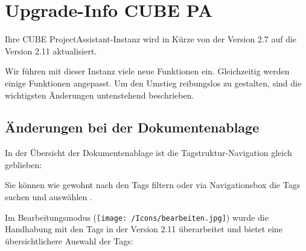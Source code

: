 \section{Upgrade-Info CUBE PA} %

Ihre CUBE ProjectAssistant-Instanz wird in Kürze von der Version 2.7 auf die Version 2.11 aktualisiert.

\vspace{\baselineskip}

Wir führen mit dieser Instanz viele neue Funktionen ein. Gleichzeitig werden einige Funktionen angepasst. Um den Umstieg reibungslos zu gestalten, sind die wichtigsten Änderungen untenstehend beschrieben.


\subsection{Änderungen bei der Dokumentenablage} %

In der Übersicht der Dokumentenablage ist die Tagstruktur-Navigation gleich geblieben:

\begin{figure}[H]
\end{figure}

Sie können wie gewohnt nach den Tags filtern oder via Navigationsbox die Tags suchen und auswählen .

Im Bearbeitungsmodus (\texttt{[image: /Icons/bearbeiten.jpg]}) wurde die Handhabung mit den Tags in der Version 2.11 überarbeitet und bietet eine übersichtlichere Auswahl der Tags:

\begin{figure}[H]
\end{figure}

